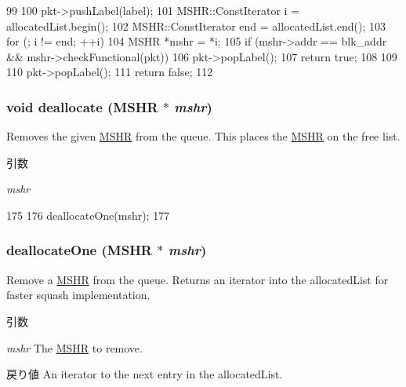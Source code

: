 \begin{DoxyCode}
99 {
100     pkt->pushLabel(label);
101     MSHR::ConstIterator i = allocatedList.begin();
102     MSHR::ConstIterator end = allocatedList.end();
103     for (; i != end; ++i) {
104         MSHR *mshr = *i;
105         if (mshr->addr == blk_addr && mshr->checkFunctional(pkt)) {
106             pkt->popLabel();
107             return true;
108         }
109     }
110     pkt->popLabel();
111     return false;
112 }
\end{DoxyCode}
\hypertarget{classMSHRQueue_a1704942edaee695477bdfc7598bd8ad7}{
\subsubsection[{deallocate}]{\setlength{\rightskip}{0pt plus 5cm}void deallocate ({\bf MSHR} $\ast$ {\em mshr})}}
\label{classMSHRQueue_a1704942edaee695477bdfc7598bd8ad7}
Removes the given \hyperlink{classMSHR}{MSHR} from the queue. This places the \hyperlink{classMSHR}{MSHR} on the free list. 
\begin{DoxyParams}{引数}
\item[{\em mshr}]\end{DoxyParams}



\begin{DoxyCode}
175 {
176     deallocateOne(mshr);
177 }
\end{DoxyCode}
\hypertarget{classMSHRQueue_a8a69fab976c144c9128fec59358d3196}{
\subsubsection[{deallocateOne}]{ deallocateOne ({\bf MSHR} $\ast$ {\em mshr})}}
\label{classMSHRQueue_a8a69fab976c144c9128fec59358d3196}
Remove a \hyperlink{classMSHR}{MSHR} from the queue. Returns an iterator into the allocatedList for faster squash implementation. 
\begin{DoxyParams}{引数}
\item[{\em mshr}]The \hyperlink{classMSHR}{MSHR} to remove. \end{DoxyParams}
\begin{DoxyReturn}{戻り値}
An iterator to the next entry in the allocatedList. 
\end{DoxyReturn}



